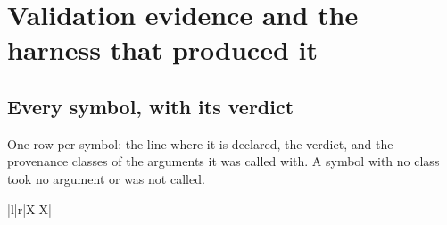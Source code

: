 \chapter{Validation evidence and the harness that produced it}\label{app:val-trace}

\section{Every symbol, with its verdict}
One row per symbol: the line where it is declared, the verdict, and the provenance
classes of the arguments it was called with. A symbol with no class took no
argument or was not called.

{\footnotesize
\begin{xltabular}{\linewidth}{|l|r|X|X|}
\caption{Symbols of the area \emph{Every symbol, with its verdict}}\\
\hline



\end{xltabular}}
